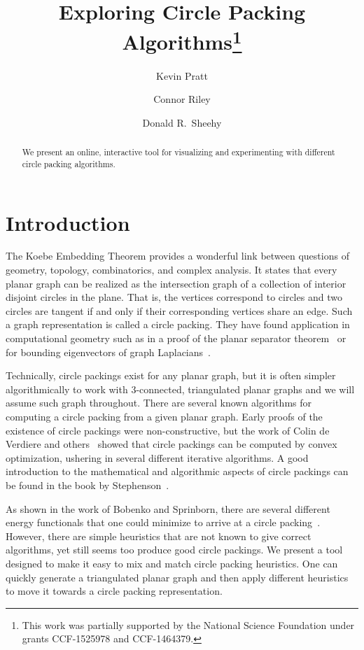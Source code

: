 \documentclass[a4paper,UKenglish]{lipics}
\title{Exploring Circle Packing Algorithms\footnote{This work was partially supported by the National Science Foundation under grants CCF-1525978 and CCF-1464379.}}
\author[1]{Kevin Pratt}
\author[2]{Connor Riley}
\author[3]{Donald R.~Sheehy}
\affil[1]{University of Connecticut\\
  \texttt{kevin.pratt@uconn.edu}}
\affil[2]{University of Connecticut\\
  \texttt{connor.riley@uconn.edu}}
\affil[3]{University of Connecticut\\
  \texttt{don.r.sheehy@gmail.com}}
\begin{document}
\maketitle

\begin{abstract}
  We present an online, interactive tool for visualizing and experimenting with different circle packing algorithms.
\end{abstract}

\section{Introduction} %
\label{sec:introduction}

  The Koebe Embedding Theorem provides a wonderful link between questions of geometry, topology, combinatorics, and complex analysis.
  It states that every planar graph can be realized as the intersection graph of a collection of interior disjoint circles in the plane.
  That is, the vertices correspond to circles and two circles are tangent if and only if their corresponding vertices share an edge.
  Such a graph representation is called a circle packing.
  They have found application in computational geometry such as in a proof of the planar separator theorem~\cite{miller97separators} or for bounding eigenvectors of graph Laplacians~\cite{kelner06spectral}.
  
  Technically, circle packings exist for any planar graph, but it is often simpler algorithmically to work with $3$-connected, triangulated planar graphs and we will assume such graph throughout.
  There are several known algorithms for computing a circle packing from a given planar graph.
  Early proofs of the existence of circle packings were non-constructive, but the work of Colin de Verdiere\cite{colindeverdiere91principe} and others~\cite{mohar93polynomial,bobenko03variational} showed that circle packings can be computed by convex optimization, ushering in several different iterative algorithms.
  A good introduction to the mathematical and algorithmic aspects of circle packings can be found in the book by Stephenson~\cite{stephenson05introduction}.
  
  As shown in the work of Bobenko and Sprinborn, there are several different energy functionals that one could minimize to arrive at a circle packing~\cite{bobenko03variational}.
  However, there are simple heuristics that are not known to give correct algorithms, yet still seems too produce good circle packings. 
  We present a tool designed to make it easy to mix and match circle packing heuristics. 
  One can quickly generate a triangulated planar graph and then apply different heuristics to move it towards a circle packing representation.
  
\end{document}
